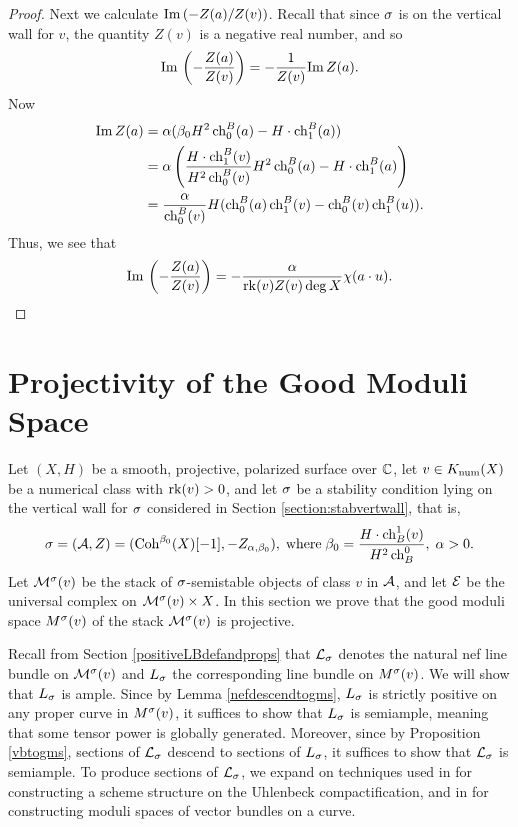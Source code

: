 \documentclass[letterpaper,11pt]{amsart}%
\theoremstyle{remark}
\begin{document}
\begin{proof}
    Next we calculate $\mathrm{Im}\,(-Z(a)/Z(v))$. Recall that since $\sigma$ is on the vertical wall for $v$, the quantity $Z(v)$ is a negative real number, and so 
    \[ \mathrm{Im}\,\left(-\frac{Z(a)}{Z(v)}\right) = -\frac{1}{Z(v)} \mathrm{Im}\, Z(a). \]
    Now 
    \begin{align*}
        \mathrm{Im}\, Z(a) & = \alpha(\beta_0 H^2 \operatorname{\mathrm{ch}}^B_0(a) - H \cdot \operatorname{\mathrm{ch}}^B_1(a)) \\
        & = \alpha \left( \frac{H \cdot \operatorname{\mathrm{ch}}^B_1(v)}{H^2 \operatorname{\mathrm{ch}}^B_0(v)} H^2 \operatorname{\mathrm{ch}}^B_0(a) - H \cdot \operatorname{\mathrm{ch}}^B_1(a) \right) \\
        & = \frac{\alpha}{\operatorname{\mathrm{ch}}^B_0(v)} H (\operatorname{\mathrm{ch}}^B_0(a) \operatorname{\mathrm{ch}}^B_1(v) - \operatorname{\mathrm{ch}}^B_0(v) \operatorname{\mathrm{ch}}^B_1(u)).
    \end{align*}
    Thus, we see that
    \[ \mathrm{Im}\,\left(-\frac{Z(a)}{Z(v)}\right) = -\frac{\alpha}{\operatorname{\mathrm{rk}}(v) Z(v) \deg X} \chi(a \cdot u). \]
\end{proof}



\section{Projectivity of the Good Moduli Space}
Let $(X, H)$ be a smooth, projective, polarized surface over $\mathbb{C}$, let $v \in K_{\mathrm{num}}(X)$ be a numerical class with $\operatorname{\mathrm{rk}}(v) > 0$, and let $\sigma$ be a stability condition lying on the vertical wall for $\sigma$ considered in Section \ref{section:stabvertwall}, that is,
\[ \sigma = (\mathcal{A}, Z) = (\mathrm{Coh}^{\beta_0}(X)[-1], -Z_{\alpha, \beta_0}), \; \mathrm{where} \; \beta_0 = \frac{H \cdot \operatorname{\mathrm{ch}}_B^1(v)}{H^2 \operatorname{\mathrm{ch}}_B^0}, \; \alpha > 0. \]
Let $\mathcal{M}^\sigma(v)$ be the stack of $\sigma$-semistable objects of class $v$ in $\mathcal{A}$, and let $\mathcal{E}$ be the universal complex on $\mathcal{M}^\sigma(v) \times X$. In this section we prove that the good moduli space $M^\sigma(v)$ of the stack $\mathcal{M}^\sigma(v)$ is projective. 

Recall from Section \ref{positiveLBdefandprops} that $\mathcal{L}_\sigma$ denotes the natural nef line bundle on $\mathcal{M}^\sigma(v)$ and $L_\sigma$ the corresponding line bundle on $M^\sigma(v)$. We will show that $L_\sigma$ is ample. Since by Lemma \ref{nefdescendtogms}, $L_\sigma$ is strictly positive on any proper curve in $M^\sigma(v)$, it suffices to show that $L_\sigma$ is semiample, meaning that some tensor power is globally generated. Moreover, since by Proposition \ref{vbtogms}, sections of $\mathcal{L}_\sigma$ descend to sections of $L_\sigma$, it suffices to show that $\mathcal{L}_\sigma$ is semiample. To produce sections of $\mathcal{L}_\sigma$, we expand on techniques used in \cite{li} for constructing a scheme structure on the Uhlenbeck compactification, and in \cite{seshadri} for constructing moduli spaces of vector bundles on a curve. 
\end{document}
